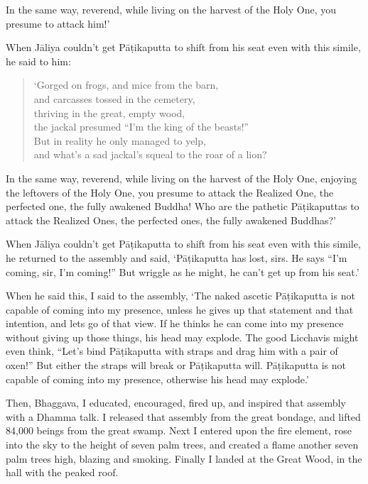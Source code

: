 \documentclass[12pt,openany]{book}%
\begin{document}
In the same way, reverend, while living on the harvest of the Holy One, you presume to attack him!’ 

When \textsanskrit{Jāliya} couldn’t get \textsanskrit{Pāṭikaputta} to shift from his seat even with this simile, he said to him: 

\begin{verse}%
‘Gorged on frogs, and mice from the barn, \\
and carcasses tossed in the cemetery, \\
thriving in the great, empty wood, \\
the jackal presumed “I’m the king of the beasts!” \\
But in reality he only managed to yelp, \\
and what’s a sad jackal’s squeal to the roar of a lion? 

%
\end{verse}

In the same way, reverend, while living on the harvest of the Holy One, enjoying the leftovers of the Holy One, you presume to attack the Realized One, the perfected one, the fully awakened Buddha! Who are the pathetic \textsanskrit{Pāṭikaputtas} to attack the Realized Ones, the perfected ones, the fully awakened Buddhas?’ 

When \textsanskrit{Jāliya} couldn’t get \textsanskrit{Pāṭikaputta} to shift from his seat even with this simile, he returned to the assembly and said, ‘\textsanskrit{Pāṭikaputta} has lost, sirs. He says “I’m coming, sir, I’m coming!” But wriggle as he might, he can’t get up from his seat.’ 

When he said this, I said to the assembly, ‘The naked ascetic \textsanskrit{Pāṭikaputta} is not capable of coming into my presence, unless he gives up that statement and that intention, and lets go of that view. If he thinks he can come into my presence without giving up those things, his head may explode. The good Licchavis might even think, “Let’s bind \textsanskrit{Pāṭikaputta} with straps and drag him with a pair of oxen!” But either the straps will break or \textsanskrit{Pāṭikaputta} will. \textsanskrit{Pāṭikaputta} is not capable of coming into my presence, otherwise his head may explode.’ 

Then, Bhaggava, I educated, encouraged, fired up, and inspired that assembly with a Dhamma talk. I released that assembly from the great bondage, and lifted 84,000 beings from the great swamp. Next I entered upon the fire element, rose into the sky to the height of seven palm trees, and created a flame another seven palm trees high, blazing and smoking. Finally I landed at the Great Wood, in the hall with the peaked roof. 
\end{document}
